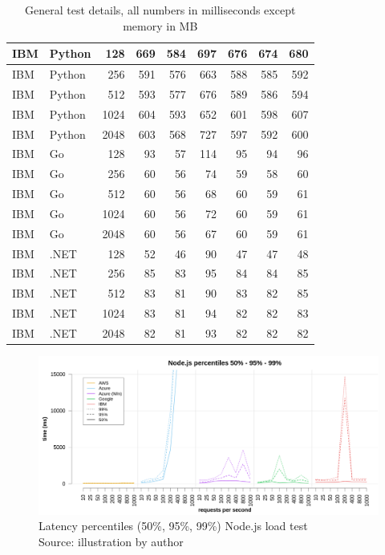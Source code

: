 \begin{table}[htp]
{\begin{tabular}{|l|l|r|r|r|r|r|r|r|}
IBM	&	Python	&	128	&	669	&	584	&	697	&	676	&	674	&	680	\\ \hline
IBM	&	Python	&	256	&	591	&	576	&	663	&	588	&	585	&	592	\\ \hline
IBM	&	Python	&	512	&	593	&	577	&	676	&	589	&	586	&	594	\\ \hline
IBM	&	Python	&	1024	&	604	&	593	&	652	&	601	&	598	&	607	\\ \hline
IBM	&	Python	&	2048	&	603	&	568	&	727	&	597	&	592	&	600	\\ \hline
IBM	&	Go	&	128	&	93	&	57	&	114	&	95	&	94	&	96	\\ \hline
IBM	&	Go	&	256	&	60	&	56	&	74	&	59	&	58	&	60	\\ \hline
IBM	&	Go	&	512	&	60	&	56	&	68	&	60	&	59	&	61	\\ \hline
IBM	&	Go	&	1024	&	60	&	56	&	72	&	60	&	59	&	61	\\ \hline
IBM	&	Go	&	2048	&	60	&	56	&	67	&	60	&	59	&	61	\\ \hline
IBM	&	.NET	&	128	&	52	&	46	&	90	&	47	&	47	&	48	\\ \hline
IBM	&	.NET	&	256	&	85	&	83	&	95	&	84	&	84	&	85	\\ \hline
IBM	&	.NET	&	512	&	83	&	81	&	90	&	83	&	82	&	85	\\ \hline
IBM	&	.NET	&	1024	&	83	&	81	&	94	&	82	&	82	&	83	\\ \hline
IBM	&	.NET	&	2048	&	82	&	81	&	93	&	82	&	82	&	82	\\ \hline
    \end{tabular}}
    \caption[General test details]{General test details, all numbers in milliseconds except memory in \gls{MB}}
    \label{tab:general}
\end{table}
\renewcommand{\arraystretch}{1}

\newpage

\begin{figure}[t]
\begin{center}
\includegraphics[width=1\textwidth]{bilder/plot_percentile_latency_node.png}
\captionsetup{justification=centering, labelfont=bf}
\caption[Latency percentiles (50\%, 95\%, 99\%) Node.js load test]{Latency percentiles (50\%, 95\%, 99\%) Node.js load test\\Source: illustration by author}
\label{fig:loadtest_percentile_node}
\end{center}
\end{figure}

